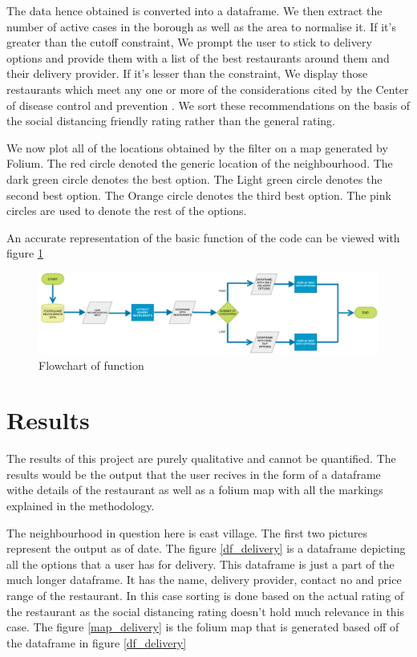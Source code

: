 \documentclass[11pt]{report}
\begin{document}
\par The data hence obtained is converted into a dataframe. We then extract the number of active cases in the borough as well as the area to normalise it. If it's greater than the cutoff constraint, We prompt the user to stick to delivery options and provide them with a list of the best restaurants around them and their delivery provider. If it's lesser than the constraint, We display those restaurants which meet any one or more of the considerations cited by the Center of disease control and prevention \cite{restaurantconsiderations:article}. We sort these recommendations on the basis of the social distancing friendly rating rather than the general rating. 
\par We now plot all of the locations obtained by the filter on a map generated by Folium. The red circle denoted the generic location of the neighbourhood. The dark green circle denotes the best option. The Light green circle denotes the second best option. The Orange circle denotes the third best option. The pink circles are used to denote the rest of the options. 
\par An accurate representation of the basic function of the code can be viewed with figure \ref{flowchart}

\begin{figure}[ht]
  \includegraphics[width =\columnwidth]{flowchart.png}
  \caption{Flowchart of function}
  \label{flowchart}
\end{figure}

\chapter{Results}
\par The results of this project are purely qualitative and cannot be quantified. The results would be the output that the user recives in the form of a dataframe withe details of the restaurant as well as a folium map with all the markings explained in the methodology. 
\par The neighbourhood in question here is east village. The first two pictures represent the output as of date. The figure \ref{df_delivery} is a dataframe depicting all the options that a user has for delivery. This dataframe is just a part of the much longer dataframe. It has the name, delivery provider, contact no and price range of the restaurant. In this case sorting is done based on the actual rating of the restaurant as the social distancing rating doesn't hold much relevance in this case. The figure \ref{map_delivery} is the folium map that is generated based off of the dataframe in figure \ref{df_delivery}
\end{document}
